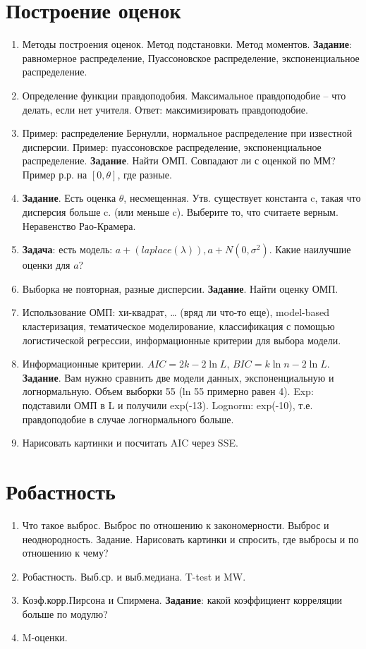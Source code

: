 \section{Построение оценок}

\begin{enumerate}
\item	Методы построения оценок. Метод подстановки. Метод моментов. \textbf{Задание}: равномерное распределение, Пуассоновское распределение, экспоненциальное распределение.
\item	Определение функции правдоподобия. Максимальное правдоподобие – что делать, если нет учителя. Ответ: максимизировать правдоподобие.
\item	Пример: распределение Бернулли, нормальное распределение при известной дисперсии. Пример: пуассоновское распределение, экспоненциальное распределение. \textbf{Задание}. Найти ОМП. Совпадают ли с оценкой по ММ?
Пример р.р. на $[0,\theta]$, где разные.
\item	\textbf{Задание}. Есть оценка $\theta$, несмещенная. Утв. существует константа c, такая что дисперсия больше c. (или меньше c). Выберите то, что считаете верным.
Неравенство Рао-Крамера.
\item	\textbf{Задача}: есть модель: $a+(laplace(\lambda)), a+N(0, \sigma^2)$. Какие наилучшие оценки для $a$?
\item	Выборка не повторная, разные дисперсии. \textbf{Задание}. Найти оценку ОМП.
\item	Использование ОМП: хи-квадрат, … (вряд ли что-то еще), model-based кластеризация, тематическое моделирование, классификация с помощью логистической регрессии, информационные критерии для выбора модели.
\item	Информационные критерии. $AIC = 2k -2 \ln L$, $BIC = k \ln n - 2 \ln L$.
\textbf{Задание}. Вам нужно сравнить две модели данных, экспоненциальную и логнормальную. Объем выборки 55 (ln 55 примерно равен 4). Exp: подставили ОМП в L и получили exp(-13). Lognorm: exp(-10), т.е. правдоподобие в случае логнормального больше.
\item	Нарисовать картинки и посчитать AIC через SSE.
\end{enumerate}

\section{Робастность}
\begin{enumerate}
\item	Что такое выброс. Выброс по отношению к закономерности. Выброс и неоднородность. Задание. Нарисовать картинки и спросить, где выбросы и по отношению к чему?
\item	Робастность. Выб.ср. и выб.медиана. T-test и MW.
\item	Коэф.корр.Пирсона и Спирмена. \textbf{Задание}: какой коэффициент корреляции больше по модулю?
\item	M-оценки.
\end{enumerate}


